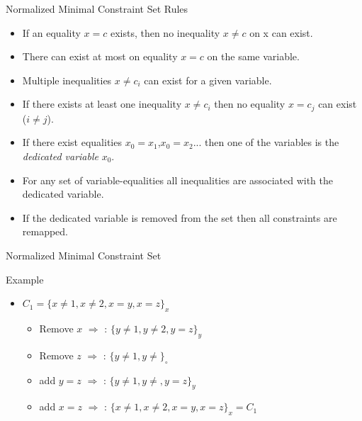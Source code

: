 \begin{frame}{Normalized Minimal Constraint Set Rules}
\begin{itemize}
\item If an equality $x=c$ exists, then no inequality $x\neq c$ on x can exist.
\item There can exist at most on equality $x=c$ on the same variable.
\item Multiple inequalities $x \neq c_i$ can exist for a given variable.
\item If there exists at least one inequality $x\neq c_i$ then no equality $x=c_j$ can exist ($i\neq j$).
\item If there exist equalities $x_0=x_1$,$x_0=x_2$$...$ then one of the variables is the {\em dedicated variable} $x_0$.
\item For any set of variable-equalities all inequalities are associated with the dedicated variable.
\item If the dedicated variable is removed from the set then all constraints are remapped.
\end{itemize}
\end{frame}

\begin{frame}{Normalized Minimal Constraint Set}

\begin{block}{Example}

\begin{itemize}
\item $C_1=\{x\neq 1, x\neq 2, x=y, x=z\}_x$ 
\begin{itemize}
\item Remove $x$ $\Rightarrow$ : $\{y\neq 1, y\neq 2, y=z\}_y$
\item Remove $z$ $\Rightarrow$ : $\{y\neq 1, y\neq \}_{\circ}$
\item add $y=z$ $\Rightarrow$ : $\{y\neq 1, y\neq, y=z\}_y$
\item add $x=z$ $\Rightarrow$ : $\{x\neq 1, x\neq 2, x=y, x=z\}_x=C_1$
\end{itemize}
\end{itemize}

\end{block}

\end{frame}

